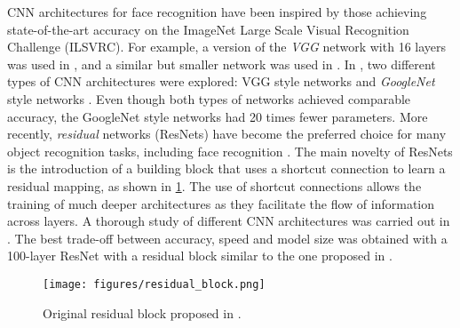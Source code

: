 \documentclass[conference]{IEEEtran}
\begin{document}
CNN architectures for face recognition have been inspired by those achieving state-of-the-art accuracy on the ImageNet Large Scale Visual Recognition Challenge (ILSVRC). For example, a version of the \textit{VGG} network \cite{simonyan2014very} with 16 layers was used in \cite{parkhi2015deep}, and a similar but smaller network was used in \cite{yi2014learning}. In \cite{schroff2015facenet}, two different types of CNN architectures were explored: VGG style networks \cite{simonyan2014very} and \textit{GoogleNet} style networks \cite{szegedy2015going}. Even though both types of networks achieved comparable accuracy, the GoogleNet style networks had 20 times fewer parameters. More recently, \textit{residual} networks (ResNets) \cite{he2016deep} have become the preferred choice for many object recognition tasks, including face recognition \cite{ranjan2017l2,liu2017sphereface,wu2017deep,hasnat2017deepvisage,wang2018cosface,wang2018additive,deng2018arcface}. The main novelty of ResNets is the introduction of a building block that uses a shortcut connection to learn a residual mapping, as shown in \cref{fig:residual_block}. The use of shortcut connections allows the training of much deeper architectures as they facilitate the flow of information across layers. A thorough study of different CNN architectures was carried out in \cite{deng2018arcface}. The best trade-off between accuracy, speed and model size was obtained with a 100-layer ResNet with a residual block similar to the one proposed in \cite{yamada2016deep}.

\begin{figure}[tb]
    \centering
    \texttt{[image: figures/residual\_block.png]}
    \caption{Original residual block proposed in \cite{he2016deep}.}
    \label{fig:residual_block}
\end{figure}
\end{document}

